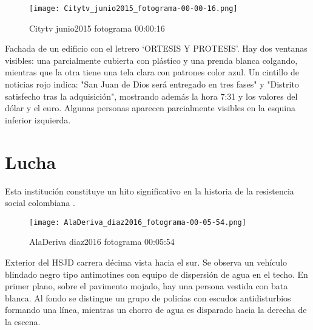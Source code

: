 \clearpage
\begin{figure}[h!]
    \centering
    \texttt{[image: Citytv\_junio2015\_fotograma-00-00-16.png]}
    \caption{Citytv junio2015 fotograma 00:00:16}
    \label{fig:Citytv_junio2015_fotograma_00_00_16}
\end{figure}

Fachada de un edificio con el letrero `ORTESIS Y PROTESIS'. Hay dos ventanas visibles: una parcialmente cubierta con plástico y una prenda blanca colgando, mientras que la otra tiene una tela clara con patrones color azul. Un cintillo de noticias rojo indica: "San Juan de Dios será entregado en tres fases" y "Distrito satisfecho tras la adquisición", mostrando además la hora 7:31 y los valores del dólar y el euro. Algunas personas aparecen parcialmente visibles en la esquina inferior izquierda. \parencite[fotograma: 00:00:16]{Citytv_junio2015}

\clearpage
\section{Lucha}

Esta institución constituye un hito significativo en la historia de la resistencia social colombiana \parencite{Gongora2013}.


\clearpage
\begin{figure}[h!]
    \centering
    \texttt{[image: AlaDeriva\_diaz2016\_fotograma-00-05-54.png]}
    \caption{AlaDeriva diaz2016 fotograma 00:05:54}
    \label{fig:AlaDeriva_diaz2016_fotograma_00_05_54}
\end{figure}

Exterior del HSJD carrera décima vista hacia el sur. Se observa un vehículo blindado negro tipo antimotines con equipo de dispersión de agua en el techo. En primer plano, sobre el pavimento mojado, hay una persona vestida con bata blanca. Al fondo se distingue un grupo de policías con escudos antidisturbios formando una línea, mientras un chorro de agua es disparado hacia la derecha de la escena. \parencite[fotograma: 00:05:54]{AlaDeriva_diaz2016}

